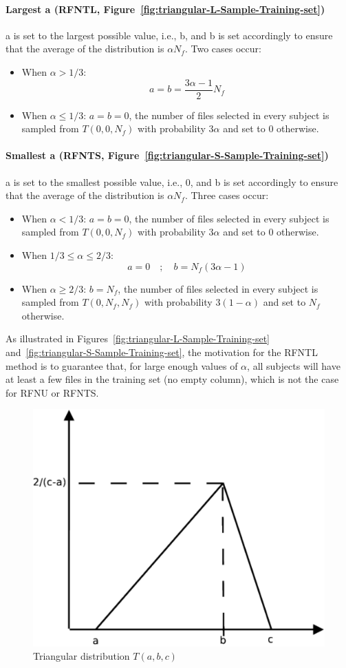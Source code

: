 \documentclass[10pt, conference, compsocconf]{IEEEtran}
\begin{document}
\paragraph{Largest a (RFNTL, 
Figure~\ref{fig:triangular-L-Sample-Training-set})} a is set to the 
largest possible value, i.e., b, and b is set accordingly to ensure 
that the average of the distribution is $\alpha N_{f}$. Two cases occur:
\begin{itemize}
\item When $\alpha > 1/3$:
\[ \textit{a}=\textit{b}=\frac{3\alpha-1}{2}N_{f}
\]
\item When $\alpha \leq 1/3$: $a=b=0$, the number of files selected 
in every subject is sampled from $T(0, 0, N_f)$ with probability 
$3\alpha$ and set to 0 otherwise.
\end{itemize}

\paragraph{Smallest a (RFNTS, 
Figure~\ref{fig:triangular-S-Sample-Training-set})} a is set to the 
smallest possible value, i.e., 0, and b is set accordingly to ensure that the average of the
distribution is $\alpha N_{f}$. Three cases occur:
\begin{itemize}
\item When $\alpha < 1/3$: $a=b=0$, the number of files 
selected in every subject is sampled from $T(0, 0, N_f)$ with 
probability $3\alpha$ and set to 0 otherwise.
\item When $1/3 \leq \alpha \leq 2/3$:
\[
          \textit{a} = 0   \quad ; \quad
          \textit{b}=N_{f}(3\alpha-1)
\]
\item When $\alpha \geq 2/3$: $b=N_f$, the number of files selected in 
every subject is sampled from $T(0, N_f, N_f)$ with probability 
$3(1-\alpha)$ 
and set to $N_f$ otherwise.
\end{itemize}

As illustrated in Figures~\ref{fig:triangular-L-Sample-Training-set} 
and~\ref{fig:triangular-S-Sample-Training-set}, the motivation for the 
RFNTL method is to guarantee that, for large enough values of 
$\alpha$, all subjects will have at least a few files in the training 
set (no empty column), which is not the case for RFNU or RFNTS.
\begin{figure}
\centering
\includegraphics[width=0.5\columnwidth]{figures/triangular.pdf}
\caption{Triangular distribution $T(a, b, c)$}
\label{fig:triangular}
\end{figure}
\end{document}
